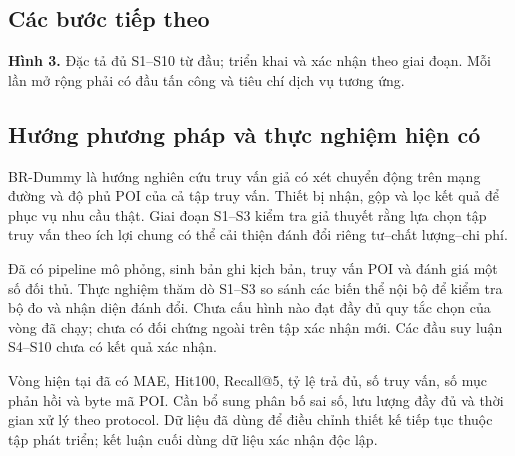 \documentclass[10pt,a4paper]{article}
\begin{document}
\subsection{Các bước tiếp theo}
\begin{center}
\end{center}
\textbf{Hình 3.} Đặc tả đủ S1--S10 từ đầu; triển khai và xác nhận theo giai đoạn. Mỗi lần mở rộng phải có đầu tấn công và tiêu chí dịch vụ tương ứng.

\subsection{Hướng phương pháp và thực nghiệm hiện có}
BR-Dummy là hướng nghiên cứu truy vấn giả có xét chuyển động trên mạng đường và độ phủ POI của cả tập truy vấn. Thiết bị nhận, gộp và lọc kết quả để phục vụ nhu cầu thật. Giai đoạn S1--S3 kiểm tra giả thuyết rằng lựa chọn tập truy vấn theo ích lợi chung có thể cải thiện đánh đổi riêng tư--chất lượng--chi phí.

Đã có pipeline mô phỏng, sinh bản ghi kịch bản, truy vấn POI và đánh giá một số đối thủ. Thực nghiệm thăm dò S1--S3 so sánh các biến thể nội bộ để kiểm tra bộ đo và nhận diện đánh đổi. Chưa cấu hình nào đạt đầy đủ quy tắc chọn của vòng đã chạy; chưa có đối chứng ngoài trên tập xác nhận mới. Các đầu suy luận S4--S10 chưa có kết quả xác nhận.

Vòng hiện tại đã có MAE, Hit100, Recall@5, tỷ lệ trả đủ, số truy vấn, số mục phản hồi và byte mã POI. Cần bổ sung phân bố sai số, lưu lượng đầy đủ và thời gian xử lý theo protocol. Dữ liệu đã dùng để điều chỉnh thiết kế tiếp tục thuộc tập phát triển; kết luận cuối dùng dữ liệu xác nhận độc lập.
\end{document}
